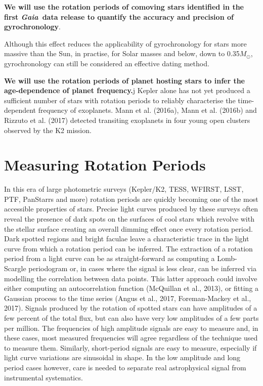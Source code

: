 \documentclass[useAMS, usenatbib, preprint, 12pt]{aastex}
\newcommand{\Gaia}{{\it Gaia}}
\begin{document}
{\bf We will use the rotation periods of comoving stars identified in the
first \Gaia\ data release to quantify the accuracy and precision of
gyrochronology}.

Although this effect reduces the applicability  of gyrochronology for stars
more massive than the Sun, in practise, for Solar masses and below, down to
0.35$M_\odot$, gyrochronology can still be considered an effective dating
method.

{\bf We will use the rotation periods of planet hosting stars to infer
the age-dependence of planet frequency.}j Kepler alone has not yet produced a
sufficient number of stars with rotation periods to reliably characterise the
time-dependent frequency of exoplanets.
Mann et al. (2016a), Mann et al. (2016b) and Rizzuto et al. (2017) detected
transiting exoplanets in four young open clusters observed by the K2 mission.

\section{Measuring Rotation Periods}
In this era of large photometric surveys (Kepler/K2, TESS, WFIRST, LSST, PTF,
PanStarrs and more) rotation periods are quickly becoming one of the most
accessible properties of stars.
Precise light curves produced by these surveys often reveal the presence of
dark spots on the surfaces of cool stars which revolve with the stellar
surface creating an overall dimming effect once every rotation period.
Dark spotted regions and bright faculae leave a characteristic trace in the
light curve from which a rotation period can be inferred.
The extraction of a rotation period from a light curve can be as
straight-forward as computing a Lomb-Scargle periodogram or, in cases where
the signal is less clear, can be inferred via modelling the correlation
between data points.
This latter approach could involve either computing an autocorrelation
function (McQuillan et al., 2013), or fitting a Gaussian process to the time
series (Angus et al., 2017, Foreman-Mackey et al., 2017).
Signals produced by the rotation of spotted stars can have amplitudes of a few
percent of the total flux, but can also have very low amplitudes of a few
parts per million.
The frequencies of high amplitude signals are easy to measure and, in these
cases, most measured frequencies will agree regardless of the technique used
to measure them.
Similarly, short-period signals are easy to measure, especially if light curve
variations are sinusoidal in shape.
In the low amplitude and long period cases however, care is needed to separate
real astrophysical signal from instrumental systematics.
\end{document}
